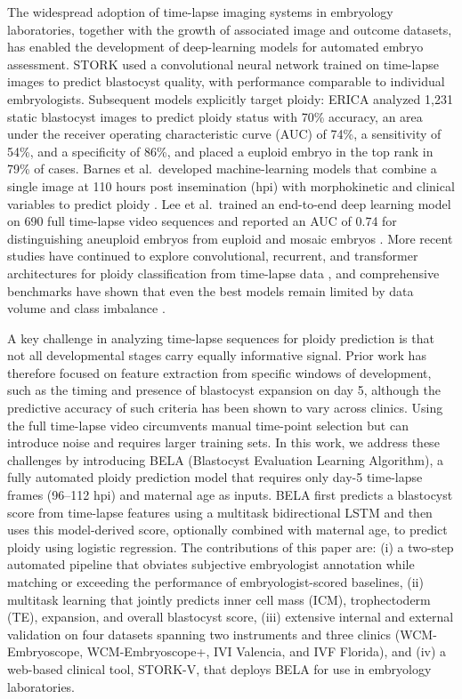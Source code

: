 The widespread adoption of time-lapse imaging systems in embryology laboratories, together with the growth of associated image and outcome datasets, has enabled the development of deep-learning models for automated embryo assessment. STORK \citep{khosravi2019deep} used a convolutional neural network trained on time-lapse images to predict blastocyst quality, with performance comparable to individual embryologists. Subsequent models explicitly target ploidy: ERICA \citep{chavezbadiola2020erica} analyzed 1{,}231 static blastocyst images to predict ploidy status with 70\% accuracy, an area under the receiver operating characteristic curve (AUC) of 74\%, a sensitivity of 54\%, and a specificity of 86\%, and placed a euploid embryo in the top rank in 79\% of cases. Barnes et al.\ developed machine-learning models that combine a single image at 110 hours post insemination (hpi) with morphokinetic and clinical variables to predict ploidy \citep{barnes2023nonhinvasive}. Lee et al.\ trained an end-to-end deep learning model on 690 full time-lapse video sequences and reported an AUC of 0.74 for distinguishing aneuploid embryos from euploid and mosaic embryos \citep{lee2021endtoend}. More recent studies have continued to explore convolutional, recurrent, and transformer architectures for ploidy classification from time-lapse data \citep{paya2023deeplearning,chen2023knowledge,handayani2024unet,canat2024morphokinetic,avidiansyah2025vit,maekawa2026aiprediction,ma2024idascore}, and comprehensive benchmarks have shown that even the best models remain limited by data volume and class imbalance \citep{bamford2023ml12,zou2022timelapse}.

A key challenge in analyzing time-lapse sequences for ploidy prediction is that not all developmental stages carry equally informative signal. Prior work has therefore focused on feature extraction from specific windows of development, such as the timing and presence of blastocyst expansion on day 5, although the predictive accuracy of such criteria has been shown to vary across clinics. Using the full time-lapse video circumvents manual time-point selection but can introduce noise and requires larger training sets. In this work, we address these challenges by introducing BELA (Blastocyst Evaluation Learning Algorithm), a fully automated ploidy prediction model that requires only day-5 time-lapse frames (96--112 hpi) and maternal age as inputs. BELA first predicts a blastocyst score from time-lapse features using a multitask bidirectional LSTM and then uses this model-derived score, optionally combined with maternal age, to predict ploidy using logistic regression. The contributions of this paper are: (i) a two-step automated pipeline that obviates subjective embryologist annotation while matching or exceeding the performance of embryologist-scored baselines, (ii) multitask learning that jointly predicts inner cell mass (ICM), trophectoderm (TE), expansion, and overall blastocyst score, (iii) extensive internal and external validation on four datasets spanning two instruments and three clinics (WCM-Embryoscope, WCM-Embryoscope+, IVI Valencia, and IVF Florida), and (iv) a web-based clinical tool, STORK-V, that deploys BELA for use in embryology laboratories.

